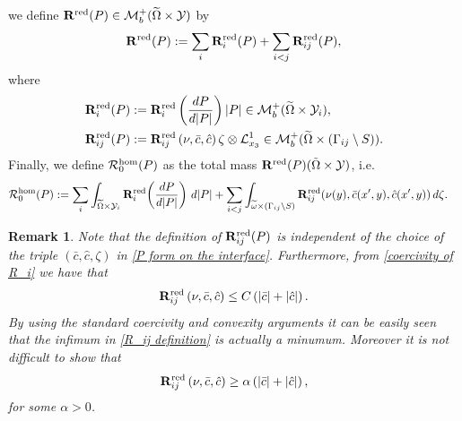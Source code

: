 \documentclass[reqno,10pt]{amsart}
\numberwithin{equation}{section}
\newtheorem{remark}[theorem]{Remark}
\theoremstyle{remark}
\newcommand{\calL}{\mathcal{L}}
\newcommand{\calR}{\mathcal{R}}
\newcommand{\calY}{\mathcal{Y}}
\newcommand{\Mb}{\mathcal{M}_b}
\newcommand{\ext}[1]{\widetilde{#1}}
\newcommand{\disspot}{\mathbf{R}}
\begin{document}
we define $\disspot^{\rm red}(P) \in \Mb^+(\ext{\Omega} \times \calY)$ by
\begin{equation} \label{R^red measure definition}
	\disspot^{\rm red}(P) := \sum_{i} \disspot_i^{\rm red}(P) + \sum_{i < j} \disspot_{ij}^{\rm red}(P),
\end{equation}
where
\begin{align*}
	& \disspot_i^{\rm red}(P) := \disspot_i^{\rm red}\left(\frac{dP}{d|P|}\right)|P| \in \Mb^+(\ext{\Omega} \times \calY_i),
	\\& \disspot_{ij}^{\rm red}(P) := \disspot_{ij}^{\rm red}\left(\nu,\bar{c},\hat{c}\right) \zeta \otimes \calL_{x_3}^1 \in \Mb^+(\ext{\Omega} \times (\Gamma_{ij} \setminus S)).
\end{align*}
Finally, we define $\calR^{\rm hom}_{0}(P)$ as the total mass $\disspot^{\rm red}(P)(\tilde{\Omega}\times \mathcal{Y})$, i.e.
\begin{align} \label{definition R^hom_0}
\begin{split}
	\calR^{\rm hom}_{0}(P) & := \sum_{i} \int_{\ext{\Omega} \times \calY_i} \disspot^{\rm red}_i\!\left(\frac{dP}{d|P|}\right) \,d|P| 
	+ \sum_{i < j} \int_{\ext{\omega} \times (\Gamma_{ij} \setminus S)} \disspot^{\rm red}_{ij}(\nu(y), \bar{c}(x',y), \hat{c}(x',y)) \,d\zeta.
\end{split}
\end{align}

\begin{remark} \label{minimum attained} 
Note that the definition of $\disspot_{ij}^{\rm red}(P)$ is independent of the choice of the triple $(\bar{c}, \hat{c}, \zeta)$ in \eqref{P form on the interface}.
Furthermore, from \eqref{coercivity of R_i} we have that 
\begin{equation} \label{boundedness interface} 
	\disspot_{ij}^{\rm red}\left(\nu,\bar{c},\hat{c}\right) \leq C \left(|\bar{c}|+|\hat{c}|\right).
\end{equation}
By using the standard coercivity and convexity arguments it can be easily seen that the infimum in \eqref{R_ij definition} is actually a minumum. 
Moreover it is not difficult to show that 
\begin{equation} \label{coercivity interface} 
	\disspot_{ij}^{\rm red}\left(\nu,\bar{c},\hat{c}\right) \geq \alpha \left(|\bar{c}|+|\hat{c}|\right),
\end{equation}
for some $\alpha>0$. 
\end{remark}
\end{document}
